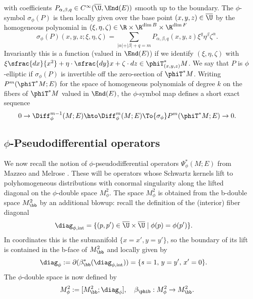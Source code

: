with coefficients $P_{\alpha,\beta,q}\in C^\infty(\overline{\U},\End(E))$ smooth up to the boundary.
The $\phi$-symbol $\sigma_{\phi}(P)$ is then locally given
over the base point $(x,y,z) \in \overline{\U}$ by
the homogeneous polynomial in $(\xi, \eta, \zeta) \in \R\times\R^{\dim B}\times\R^{\dim F}$
\begin{equation}\label{phi-diff}
\sigma_{\phi}(P) (x,y,z; \xi, \eta, \zeta)= \sum_{\vert \alpha \vert + \vert \beta \vert + q = m}
P_{\alpha,\beta,q}(x,y,z)\xi^{q}\eta^\beta \zeta^{\alpha}.
\end{equation}
Invariantly this is a function (valued in $\End(E)$) if we identify $(\xi,\eta,\zeta)$ with $\xi\sfrac{dx}{x^2}+\eta\cdot\sfrac{dy}x+\zeta\cdot dz\in \phiT^{*}_{(x,y,z)}M$.
We say that $P$ is $\phi$-elliptic if $\sigma_{\phi}(P)$ is
invertible off the zero-section of $\phiT^{*}M$.
Writing $P^{m}(\phiT^{*}M; E)$ for the space of
homogeneous polynomials of degree $k$ on the fibers of $\phiT^{*}M$ valued in $\End(E)$, the
$\phi$-symbol map defines a short exact sequence
\begin{equation}
0 \to \Diff_{\phi}^{m-1}(M; E) \hto \Diff_{\phi}^{m}(M; E)
\To{\sigma_{\phi}} P^{m}(\phiT^{*}M; E) \to 0.
\end{equation}

\subsection{\texorpdfstring{$\phi$}{phi}-Pseudodifferential operators} \label{subsec:phi psido}
We now recall the notion of $\phi$-pseudodif\-ferential operators $\Psi^{*}_{\phi}(M; E)$ from
Mazzeo and Melrose \cite{mazzeo1998pseudodifferential}. These will be opera\-tors whose
Schwartz kernels lift to polyhomogeneous distributions with conormal singularity along
the lifted diagonal on the $\phi$-double space $M^2_\phi$. The space $M^2_\phi$ is obtained from
the b-double space $M^{2}_\bb$ by an additional blowup:
recall the definition of the (interior) fiber diagonal
\begin{align*}
&\diag_{\phi,\mathrm{int}} = \{ (p, p') \in \overline{\U} \times
\overline{\U}\mid \phi(p) = \phi(p')\}.
\end{align*}
In coordinates this is the submanifold $\{x=x', y=y'\}$, so the boundary of its lift is contained in the b-face of $M^2_\bb$ and locally given by
\begin{align*}
&\diag_\phi :=
\partial(\beta_\bb^*(\diag_{\phi,\mathrm{int}})) = \{s=1,\,y = y',\,x'=0\}.
\end{align*}
The $\phi$-double space is now defined by
\begin{equation}\label{phi-double}
M_{\phi}^{2} := [M^{2}_\bb; \diag_\phi],\quad \beta_{\phib}:M_\phi^2\to M_\bb^2.
\end{equation}

